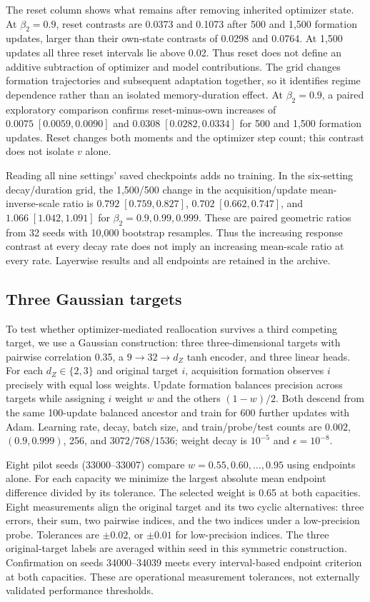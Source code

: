 The reset column shows what remains after removing inherited optimizer state. At $\beta_2=0.9$, reset contrasts are 0.0373 and 0.1073 after 500 and 1,500 formation updates, larger than their own-state contrasts of 0.0298 and 0.0764. At 1,500 updates all three reset intervals lie above 0.02. Thus reset does not define an additive subtraction of optimizer and model contributions. The grid changes formation trajectories and subsequent adaptation together, so it identifies regime dependence rather than an isolated memory-duration effect. At $\beta_2=0.9$, a paired exploratory comparison confirms reset-minus-own increases of $0.0075\;[0.0059,0.0090]$ and $0.0308\;[0.0282,0.0334]$ for 500 and 1,500 formation updates. Reset changes both moments and the optimizer step count; this contrast does not isolate $v$ alone.

Reading all nine settings' saved checkpoints adds no training. In the six-setting decay/duration grid, the 1,500/500 change in the acquisition/update mean-inverse-scale ratio is $0.792\;[0.759,0.827]$, $0.702\;[0.662,0.747]$, and $1.066\;[1.042,1.091]$ for $\beta_2=0.9,0.99,0.999$. These are paired geometric ratios from 32 seeds with 10,000 bootstrap resamples. Thus the increasing response contrast at every decay rate does not imply an increasing mean-scale ratio at every rate. Layerwise results and all endpoints are retained in the archive.

\subsection{Three Gaussian targets}
\label{app:threeadapt}
To test whether optimizer-mediated reallocation survives a third competing target, we use a Gaussian construction: three three-dimensional targets with pairwise correlation 0.35, a $9\to32\to d_Z$ tanh encoder, and three linear heads. For each $d_Z\in\{2,3\}$ and original target $i$, acquisition formation observes $i$ precisely with equal loss weights. Update formation balances precision across targets while assigning $i$ weight $w$ and the others $(1-w)/2$. Both descend from the same 100-update balanced ancestor and train for 600 further updates with Adam. Learning rate, decay, batch size, and train/probe/test counts are $0.002$, $(0.9,0.999)$, 256, and $3072/768/1536$; weight decay is $10^{-5}$ and $\epsilon=10^{-8}$.

Eight pilot seeds (33000--33007) compare $w=0.55,0.60,\ldots,0.95$ using endpoints alone. For each capacity we minimize the largest absolute mean endpoint difference divided by its tolerance. The selected weight is 0.65 at both capacities. Eight measurements align the original target and its two cyclic alternatives: three errors, their sum, two pairwise indices, and the two indices under a low-precision probe. Tolerances are $\pm0.02$, or $\pm0.01$ for low-precision indices. The three original-target labels are averaged within seed in this symmetric construction. Confirmation on seeds 34000--34039 meets every interval-based endpoint criterion at both capacities. These are operational measurement tolerances, not externally validated performance thresholds.

